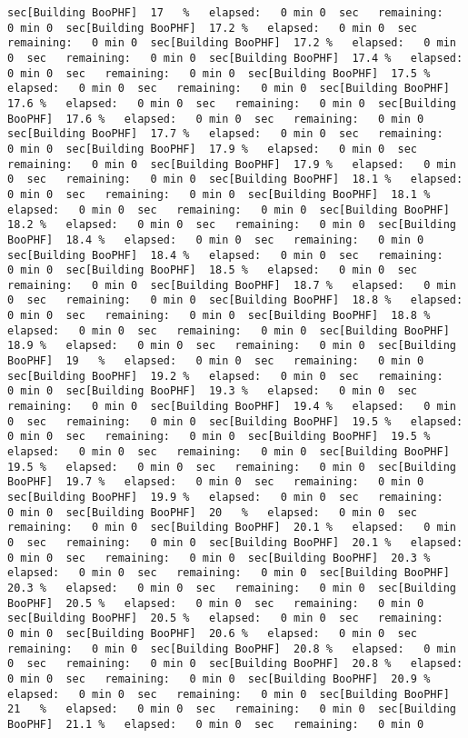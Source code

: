 \documentclass[
]{book}
\begin{document}
\begin{verbatim}
sec[Building BooPHF]  17   %   elapsed:   0 min 0  sec   remaining:   0 min 0  sec[Building BooPHF]  17.2 %   elapsed:   0 min 0  sec   remaining:   0 min 0  sec[Building BooPHF]  17.2 %   elapsed:   0 min 0  sec   remaining:   0 min 0  sec[Building BooPHF]  17.4 %   elapsed:   0 min 0  sec   remaining:   0 min 0  sec[Building BooPHF]  17.5 %   elapsed:   0 min 0  sec   remaining:   0 min 0  sec[Building BooPHF]  17.6 %   elapsed:   0 min 0  sec   remaining:   0 min 0  sec[Building BooPHF]  17.6 %   elapsed:   0 min 0  sec   remaining:   0 min 0  sec[Building BooPHF]  17.7 %   elapsed:   0 min 0  sec   remaining:   0 min 0  sec[Building BooPHF]  17.9 %   elapsed:   0 min 0  sec   remaining:   0 min 0  sec[Building BooPHF]  17.9 %   elapsed:   0 min 0  sec   remaining:   0 min 0  sec[Building BooPHF]  18.1 %   elapsed:   0 min 0  sec   remaining:   0 min 0  sec[Building BooPHF]  18.1 %   elapsed:   0 min 0  sec   remaining:   0 min 0  sec[Building BooPHF]  18.2 %   elapsed:   0 min 0  sec   remaining:   0 min 0  sec[Building BooPHF]  18.4 %   elapsed:   0 min 0  sec   remaining:   0 min 0  sec[Building BooPHF]  18.4 %   elapsed:   0 min 0  sec   remaining:   0 min 0  sec[Building BooPHF]  18.5 %   elapsed:   0 min 0  sec   remaining:   0 min 0  sec[Building BooPHF]  18.7 %   elapsed:   0 min 0  sec   remaining:   0 min 0  sec[Building BooPHF]  18.8 %   elapsed:   0 min 0  sec   remaining:   0 min 0  sec[Building BooPHF]  18.8 %   elapsed:   0 min 0  sec   remaining:   0 min 0  sec[Building BooPHF]  18.9 %   elapsed:   0 min 0  sec   remaining:   0 min 0  sec[Building BooPHF]  19   %   elapsed:   0 min 0  sec   remaining:   0 min 0  sec[Building BooPHF]  19.2 %   elapsed:   0 min 0  sec   remaining:   0 min 0  sec[Building BooPHF]  19.3 %   elapsed:   0 min 0  sec   remaining:   0 min 0  sec[Building BooPHF]  19.4 %   elapsed:   0 min 0  sec   remaining:   0 min 0  sec[Building BooPHF]  19.5 %   elapsed:   0 min 0  sec   remaining:   0 min 0  sec[Building BooPHF]  19.5 %   elapsed:   0 min 0  sec   remaining:   0 min 0  sec[Building BooPHF]  19.5 %   elapsed:   0 min 0  sec   remaining:   0 min 0  sec[Building BooPHF]  19.7 %   elapsed:   0 min 0  sec   remaining:   0 min 0  sec[Building BooPHF]  19.9 %   elapsed:   0 min 0  sec   remaining:   0 min 0  sec[Building BooPHF]  20   %   elapsed:   0 min 0  sec   remaining:   0 min 0  sec[Building BooPHF]  20.1 %   elapsed:   0 min 0  sec   remaining:   0 min 0  sec[Building BooPHF]  20.1 %   elapsed:   0 min 0  sec   remaining:   0 min 0  sec[Building BooPHF]  20.3 %   elapsed:   0 min 0  sec   remaining:   0 min 0  sec[Building BooPHF]  20.3 %   elapsed:   0 min 0  sec   remaining:   0 min 0  sec[Building BooPHF]  20.5 %   elapsed:   0 min 0  sec   remaining:   0 min 0  sec[Building BooPHF]  20.5 %   elapsed:   0 min 0  sec   remaining:   0 min 0  sec[Building BooPHF]  20.6 %   elapsed:   0 min 0  sec   remaining:   0 min 0  sec[Building BooPHF]  20.8 %   elapsed:   0 min 0  sec   remaining:   0 min 0  sec[Building BooPHF]  20.8 %   elapsed:   0 min 0  sec   remaining:   0 min 0  sec[Building BooPHF]  20.9 %   elapsed:   0 min 0  sec   remaining:   0 min 0  sec[Building BooPHF]  21   %   elapsed:   0 min 0  sec   remaining:   0 min 0  sec[Building BooPHF]  21.1 %   elapsed:   0 min 0  sec   remaining:   0 min 0  
\end{verbatim}
\end{document}
